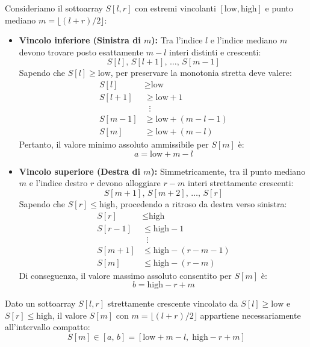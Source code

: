 Consideriamo il sottoarray $S[l, r]$ con estremi vincolanti $[\text{low}, \text{high}]$ e punto mediano $m = \lfloor (l + r)/2 \rfloor$:
\begin{itemize}
  \item \textbf{Vincolo inferiore (Sinistra di $m$):}
  Tra l'indice $l$ e l'indice mediano $m$ devono trovare posto esattamente $m - l$ interi distinti e crescenti:
  \begin{equation*}
    S[l], \, S[l+1], \, \dots, \, S[m-1]
  \end{equation*}
  Sapendo che $S[l] \ge \text{low}$, per preservare la monotonia stretta deve valere:
  \begin{align*}
    S[l] &\ge \text{low} \\
    S[l+1] &\ge \text{low} + 1 \\
    &\;\;\vdots \\
    S[m-1] &\ge \text{low} + (m - l - 1) \\
    S[m] &\ge \text{low} + (m - l)
  \end{align*}
  Pertanto, il valore minimo assoluto ammissibile per $S[m]$ \`e:
  \begin{equation}
    a = \text{low} + m - l
  \end{equation}

  \item \textbf{Vincolo superiore (Destra di $m$):}
  Simmetricamente, tra il punto mediano $m$ e l'indice destro $r$ devono alloggiare $r - m$ interi strettamente crescenti:
  \begin{equation*}
    S[m+1], \, S[m+2], \, \dots, \, S[r]
  \end{equation*}
  Sapendo che $S[r] \le \text{high}$, procedendo a ritroso da destra verso sinistra:
  \begin{align*}
    S[r] &\le \text{high} \\
    S[r-1] &\le \text{high} - 1 \\
    &\;\;\vdots \\
    S[m+1] &\le \text{high} - (r - m - 1) \\
    S[m] &\le \text{high} - (r - m)
  \end{align*}
  Di conseguenza, il valore massimo assoluto consentito per $S[m]$ \`e:
  \begin{equation}
    b = \text{high} - r + m
  \end{equation}
\end{itemize}

\begin{theorem}
Dato un sottoarray $S[l, r]$ strettamente crescente vincolato da $S[l] \ge \text{low}$ e $S[r] \le \text{high}$, il valore $S[m]$ con $m = \lfloor (l+r)/2 \rfloor$ appartiene necessariamente all'intervallo compatto:
\begin{equation}
  S[m] \in [a, \, b] = [\text{low} + m - l, \; \text{high} - r + m]
\end{equation}
\end{theorem}

